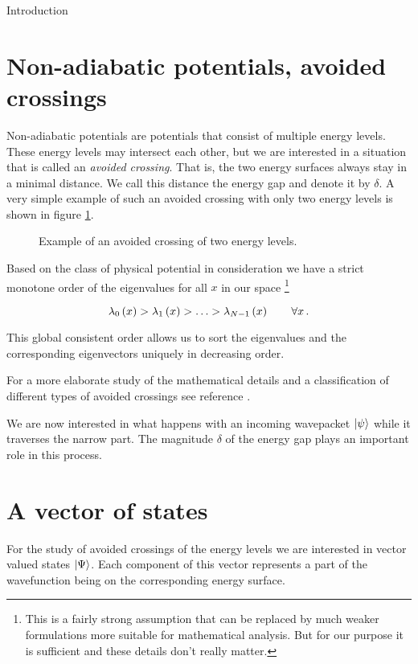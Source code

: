 \begin{chapter}{Introduction}
\section{Non-adiabatic potentials, avoided crossings}

Non-adiabatic potentials are potentials that consist of multiple energy levels.
These energy levels may intersect each other, but we are interested in a situation
that is called an \emph{avoided crossing}. That is, the two energy surfaces always
stay in a minimal distance. We call this distance the energy gap and denote it by
$\delta$. A very simple example of such an avoided crossing with only two energy
levels is shown in figure \ref{fig:example_avoided_crossing}.

\begin{figure}
  \centering
  
  \caption{Example of an avoided crossing of two energy levels.}
  \label{fig:example_avoided_crossing}
\end{figure}

Based on the class of physical potential in consideration we have a strict monotone
order of the eigenvalues for all $x$ in our space \footnote{This is a fairly strong
assumption that can be replaced by much weaker formulations more suitable for mathematical
analysis. But for our purpose it is sufficient and these details don't really matter.}

\begin{equation}
  \lambda_0\left( x \right) > \lambda_1\left( x \right) > \ldots > \lambda_{N-1}\left( x \right) \qquad \forall x \,.
\end{equation}

This global consistent order allows us to sort the eigenvalues and the corresponding
eigenvectors uniquely in decreasing order.

For a more elaborate study of the mathematical details and a classification of
different types of avoided crossings see reference \cite{H_classification}.

We are now interested in what happens with an incoming wavepacket $\Ket{\psi}$ while
it traverses the narrow part. The magnitude $\delta$ of the energy gap plays an
important role in this process.

\section{A vector of states}

For the study of avoided crossings of the energy levels we are interested in vector valued
states $\Ket{\Psi}$. Each component of this vector represents a part of the wavefunction
being on the corresponding energy surface.


\end{chapter}
